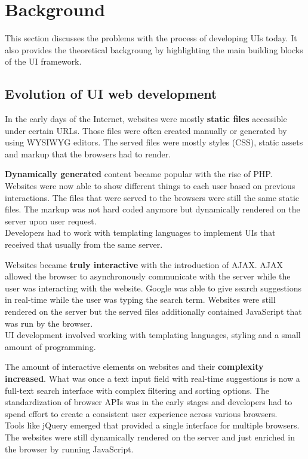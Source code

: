 \section{Background}\label{background}

This section discusses the problems with the process of developing UIs today. It also provides the theoretical backgroung by highlighting the main building blocks of the UI framework.

\subsection{Evolution of UI web development}\label{history}

In the early days of the Internet, websites were mostly \textbf{static files} accessible under certain URLs. Those files were often created manually or generated by using WYSIWYG editors. The served files were mostly styles (CSS), static assets and markup that the browsers had to render.

\textbf{Dynamically generated} content became popular with the rise of PHP. Websites were now able to show different things to each user based on previous interactions. The files that were served to the browsers were still the same static files. The markup was not hard coded anymore but dynamically rendered on the server upon user request.
\\ Developers had to work with templating languages to implement UIs that received that usually from the same server.

Websites became \textbf{truly interactive} with the introduction of AJAX. AJAX allowed the browser to asynchronously communicate with the server while the user was interacting with the website. Google was able to give search suggestions in real-time while the user was typing the search term. Websites were still rendered on the server but the served files additionally contained JavaScript that was run by the browser.
\\ UI development involved working with templating languages, styling and a small amount of programming.

The amount of interactive elements on websites and their \textbf{complexity increased}. What was once a text input field with real-time suggestions is now a full-text search interface with complex filtering and sorting options. The standardization of browser APIs was in the early stages and developers had to spend effort to create a consistent user experience across various browsers.
\\ Tools like jQuery emerged that provided a single interface for multiple browsers. The websites were still dynamically rendered on the server and just enriched in the browser by running JavaScript.

